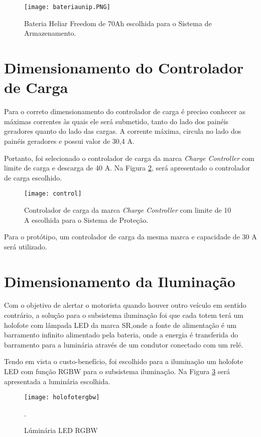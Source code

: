 \begin{figure}[H]
\centering
\texttt{[image: bateriaunip.PNG]}
\caption{Bateria Heliar Freedom de 70Ah escolhida para o Sistema de Armazenamento.}
\label{fig:bateriaunip}
\end{figure}

\section{Dimensionamento do Controlador de Carga}

Para o correto dimensionamento do controlador de carga é preciso conhecer as máximas correntes às quais ele será submetido, tanto do lado dos painéis geradores quanto do lado das cargas. A corrente máxima, circula no lado dos painéis geradores e possui valor de 30,4 A.

Portanto, foi selecionado o controlador de carga da marca \textit{Charge Controller} com limite de carga e descarga de 40 A. Na Figura \ref{fig:control}, será apresentado o controlador de carga escolhido.

\begin{figure}[H]
\centering
\texttt{[image: control]}
    \caption{Controlador de carga da marca \textit{Charge Controller} com limite de 10 A escolhida para o Sistema de Proteção.}
\label{fig:control}
\end{figure}


Para o protótipo, um controlador de carga da mesma marca e capacidade de 30 A será utilizado.

\section{Dimensionamento da Iluminação}

Com o objetivo de alertar o motorista quando houver outro veículo em sentido contrário, a solução para o subsistema iluminação foi que cada totem terá um holofote com lâmpada LED da marca SR,onde a fonte de alimentação é um barramento infinito alimentado pela bateria, onde a energia é transferida do barramento para a luminária através de um condutor conectado com um relé. 

Tendo em vista o custo-benefício, foi escolhido para a iluminação um holofote LED com função RGBW para o subsistema iluminação. Na Figura \ref{fig:holofotergbw} será apresentada a luminária escolhida.

\begin{figure}[H]
\centering
\texttt{[image: holofotergbw]}
\caption{Lúminária LED RGBW}. 
\label{fig:holofotergbw}
\end{figure}



